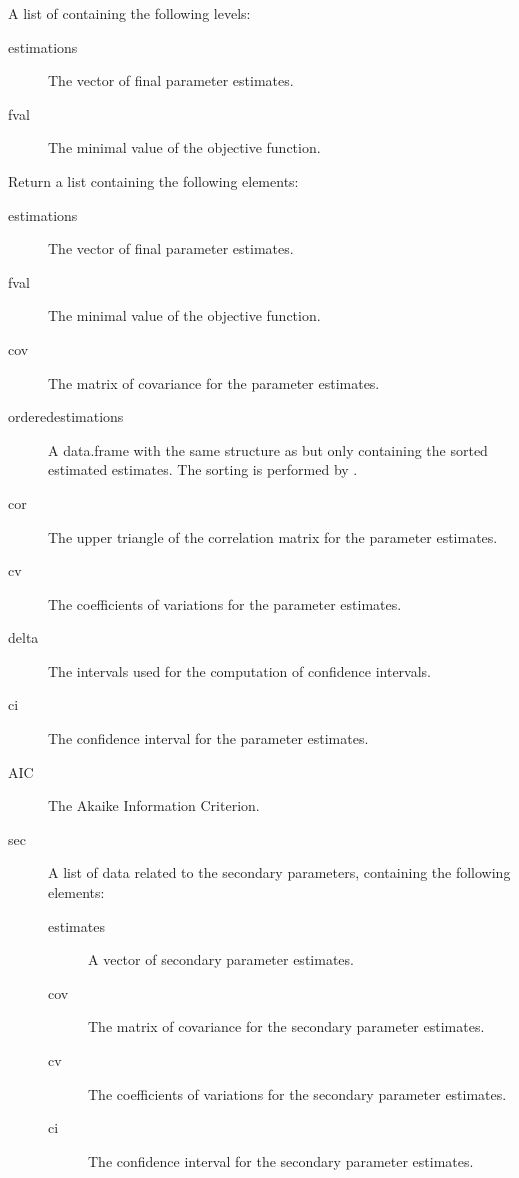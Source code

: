 \begin{Arguments}
\begin{ldescription}
\begin{description}
\end{description}


\item[\code{Fit}] A list of containing the following levels:\begin{description}

\item[estimations] The vector of final parameter estimates.
\item[fval] The minimal value of the objective function.

\end{description}


\end{ldescription}
\end{Arguments}
%
\begin{Value}
Return a list containing the following elements:\begin{description}

\item[estimations] The vector of final parameter estimates.
\item[fval] The minimal value of the objective function.
\item[cov] The matrix of covariance for the parameter estimates.
\item[orderedestimations] A data.frame with the same structure as
 but only containing the sorted estimated estimates.
The sorting is performed by .
\item[cor] The upper triangle of the correlation matrix for the parameter
estimates.
\item[cv] The coefficients of variations for the parameter estimates.
\item[delta] The intervals used for the computation of confidence
intervals.
\item[ci] The confidence interval for the parameter estimates.
\item[AIC] The Akaike Information Criterion.
\item[sec] A list of data related to the secondary parameters, containing
the following elements:\begin{description}

\item[estimates] A vector of secondary parameter estimates.
\item[cov] The matrix of covariance for the secondary parameter
estimates.
\item[cv] The coefficients of variations for the secondary parameter
estimates.
\item[ci] The confidence interval for the secondary parameter
estimates.

\end{description}



\end{description}

\end{Value}
